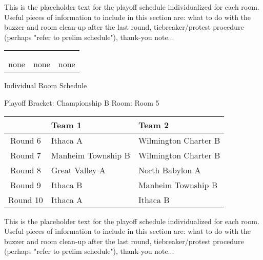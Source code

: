 \documentclass{article}%
\begin{document}
\vspace*{16pt}%
\linebreak%
This is the placeholder text for the playoff schedule individualized for each room. Useful pieces of information to include in this section are: what to do with the buzzer and room clean{-}up after the last round, tiebreaker/protest procedure (perhaps "refer to prelim schedule"), thank{-}you note...%
\vspace*{30pt}%
\newline%
%
\begin{tabularx}{\textwidth}{YYY}%
  &  &  \\%
\\%
none&none&none\\%
\end{tabularx}%
\newpage%
\begin{center}%
\begin{Huge}%
Individual Room Schedule%
\end{Huge}%
\vspace*{16pt}%
\linebreak%
\begin{Large}%
Playoff Bracket: Championship B \hfill Room: Room 5%
\end{Large}%
\end{center}%
%
\begin{tabularx}{\textwidth}{|c|Y|Y|}%
\hline%
&Team 1&Team 2\\%
\hline%
Round 6&Ithaca A&Wilmington Charter B\\%
Round 7&Manheim Township B&Wilmington Charter B\\%
Round 8&Great Valley A&North Babylon A\\%
Round 9&Ithaca B&Manheim Township B\\%
Round 10&Ithaca A&Ithaca B\\%
\hline%
\end{tabularx}%
\vspace*{16pt}%
\linebreak%
This is the placeholder text for the playoff schedule individualized for each room. Useful pieces of information to include in this section are: what to do with the buzzer and room clean{-}up after the last round, tiebreaker/protest procedure (perhaps "refer to prelim schedule"), thank{-}you note...%
\vspace*{30pt}%
\newline%
\end{document}
